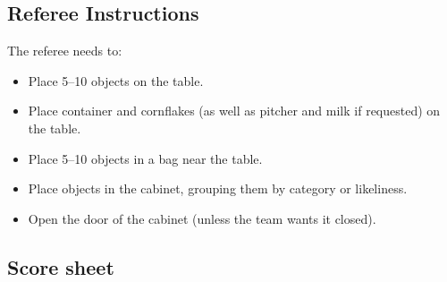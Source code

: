 \subsection*{Referee Instructions}

The referee needs to:
\begin{itemize}
	\item Place 5--10 objects on the table.
	\item Place container and cornflakes (as well as pitcher and milk if requested) on the table.
	\item Place 5--10 objects in a bag near the table.
	\item Place objects in the cabinet, grouping them by category or likeliness.
	\item Open the door of the cabinet (unless the team wants it closed).
\end{itemize}


\subsection*{Score sheet}


